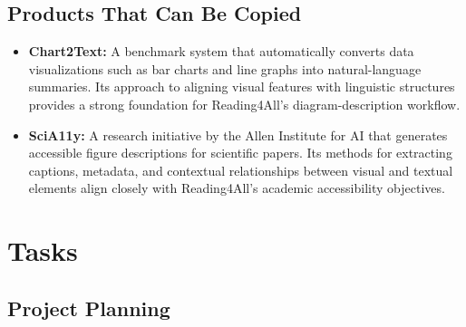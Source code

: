 \documentclass[12pt]{article}
\begin{document}
\subsection{Products That Can Be Copied}

\begin{itemize}
  \item \textbf{Chart2Text:} A benchmark system that automatically
    converts data visualizations such as bar charts and line graphs
    into natural-language summaries. Its approach to aligning visual
    features with linguistic structures provides a strong foundation
    for Reading4All’s diagram-description workflow.

  \item \textbf{SciA11y:} A research initiative by the Allen
    Institute for AI that generates accessible figure descriptions
    for scientific papers. Its methods for extracting captions,
    metadata, and contextual relationships between visual and textual
    elements align closely with Reading4All’s academic accessibility objectives.
\end{itemize}
\section{Tasks}

\subsection{Project Planning}
\end{document}
